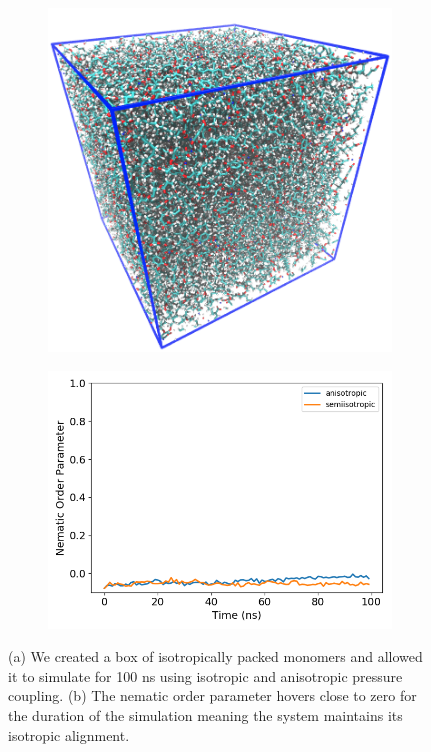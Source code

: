 \documentclass[journal=jpcbfk,manusciprt=article]{achemso}
\begin{document}
  \begin{figure}[!htb]
  \centering
  \begin{subfigure}{0.45\textwidth}
  \includegraphics[width=\textwidth]{isotropic_box.png}
  \caption{}\label{fig:isotropic_box}
  \end{subfigure}
  \begin{subfigure}{0.45\textwidth}
  \includegraphics[width=\textwidth]{nematic_isotropic.png}
  \caption{}\label{fig:nematic_isotropic}
  \end{subfigure}
  \caption{(a) We created a box of isotropically packed monomers and allowed it to simulate
  for 100 ns using isotropic and anisotropic pressure coupling. (b) The nematic order 
  parameter hovers close to zero for the duration of the simulation meaning the system
  maintains its isotropic alignment.}\label{fig:self_assembly}
  \end{figure}
\end{document}
